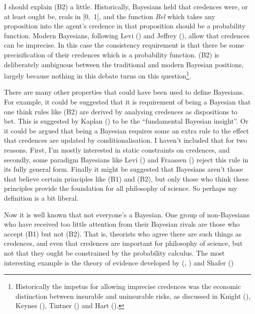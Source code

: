 \documentclass[
  10pt,
  letterpaper,
  DIV=11,
  numbers=noendperiod,
  twoside]{scrartcl}
\begin{document}
I should explain (B2) a little. Historically, Bayesians held that
credences were, or at least ought be, reals in {[}0,~1{]}, and the
function \emph{Bel} which takes any proposition into the agent's
credence in that proposition should be a probability function. Modern
Bayesians, following Levi () and Jeffrey
(), allow that credences can be
imprecise. In this case the consistency requirement is that there be
some precisification of their credences which is a probability function.
(B2) is deliberately ambiguous between the traditional and modern
Bayesian positions, largely because nothing in this debate turns on this
question\footnote{Historically the impetus for allowing imprecise
  credences was the economic distinction between insurable and
  uninsurable risks, as discussed in Knight
  (), Keynes
  (), Tintner
  () and Hart
  ().}.

There are many other properties that could have been used to define
Bayesians. For example, it could be suggested that it is requirement of
being a Bayesian that one think rules like (B2) are derived by analysing
credences as dispositions to bet. This is suggested by Kaplan
() to be the ``fundamental Bayesian
insight''. Or it could be argued that being a Bayesian requires some an
extra rule to the effect that credences are updated by
conditionalisation. I haven't included that for two reasons. First, I'm
mostly interested in static constraints on credences, and secondly, some
paradigm Bayesians like Levi () and
Fraassen () reject this rule in its
fully general form. Finally it might be suggested that Bayesians aren't
those that believe certain principles like (B1) and (B2), but only those
who think these principles provide the foundation for all philosophy of
science. So perhaps my definition is a bit liberal.

Now it is well known that not everyone's a Bayesian. One group of
non-Bayesians who have received too little attention from their Bayesian
rivals are those who accept (B1) but not (B2). That is, theorists who
agree there are such things as credences, and even that credences are
important for philosophy of science, but not that they ought be
constrained by the probability calculus. The most interesting example is
the theory of evidence developed by
(,
) and Shafer
()
\end{document}
